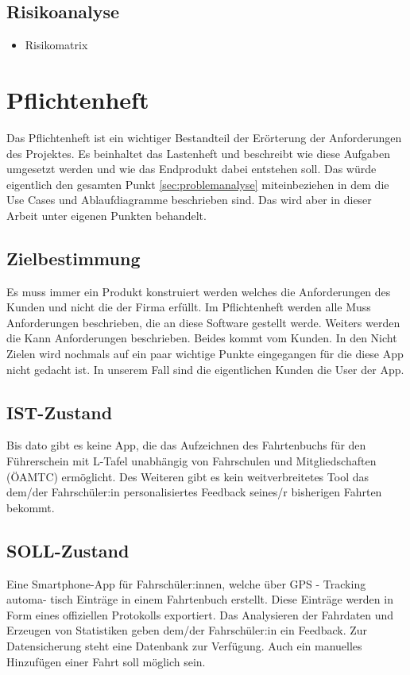 \subsection{Risikoanalyse}

\begin{itemize}
	\item Risikomatrix
\end{itemize}

\newpage
\section{Pflichtenheft}

Das Pflichtenheft ist ein wichtiger Bestandteil der Erörterung der Anforderungen des Projektes. Es beinhaltet das Lastenheft und beschreibt wie diese Aufgaben umgesetzt werden und wie das Endprodukt dabei entstehen soll. Das würde eigentlich den gesamten Punkt \ref{sec:problemanalyse} miteinbeziehen in dem die Use Cases und Ablaufdiagramme beschrieben sind. Das wird aber in dieser Arbeit unter eigenen Punkten behandelt.

\subsection{Zielbestimmung}
Es muss immer ein Produkt konstruiert werden welches die Anforderungen des Kunden und nicht die der Firma erfüllt. Im Pflichtenheft werden alle Muss Anforderungen beschrieben, die an diese Software gestellt werde. Weiters werden die Kann Anforderungen beschrieben. Beides kommt vom Kunden. In den Nicht Zielen wird nochmals auf ein paar wichtige Punkte eingegangen für die diese App nicht gedacht ist. In unserem Fall sind die eigentlichen Kunden die User der App.

\subsection{IST-Zustand}
Bis dato gibt es keine App, die das Aufzeichnen des Fahrtenbuchs für den Führerschein mit L-Tafel unabhängig von Fahrschulen und Mitgliedschaften (ÖAMTC) ermöglicht. Des Weiteren gibt es kein weitverbreitetes Tool das dem/der Fahrschüler:in personalisiertes Feedback seines/r bisherigen Fahrten bekommt.

\subsection{SOLL-Zustand}
Eine Smartphone-App für Fahrschüler:innen, welche über GPS - Tracking automa-
tisch Einträge in einem Fahrtenbuch erstellt. Diese Einträge werden in Form eines
offiziellen Protokolls exportiert. Das Analysieren der Fahrdaten und Erzeugen von
Statistiken geben dem/der Fahrschüler:in ein Feedback. Zur Datensicherung steht
eine Datenbank zur Verfügung. Auch ein manuelles Hinzufügen einer Fahrt soll möglich sein.

